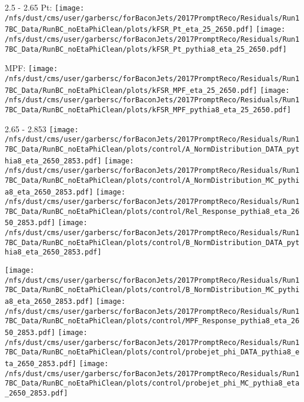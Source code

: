 \documentclass[t,compress]{beamer}
\begin{document}
\begin{frame}{2.5 - 2.65}
	 Pt: \texttt{[image: /nfs/dust/cms/user/garbersc/forBaconJets/2017PromptReco/Residuals/Run17BC\_Data/RunBC\_noEtaPhiClean/plots/kFSR\_Pt\_eta\_25\_2650.pdf]}
	\texttt{[image: /nfs/dust/cms/user/garbersc/forBaconJets/2017PromptReco/Residuals/Run17BC\_Data/RunBC\_noEtaPhiClean/plots/kFSR\_Pt\_pythia8\_eta\_25\_2650.pdf]}
\newline

	 MPF: \texttt{[image: /nfs/dust/cms/user/garbersc/forBaconJets/2017PromptReco/Residuals/Run17BC\_Data/RunBC\_noEtaPhiClean/plots/kFSR\_MPF\_eta\_25\_2650.pdf]}
	\texttt{[image: /nfs/dust/cms/user/garbersc/forBaconJets/2017PromptReco/Residuals/Run17BC\_Data/RunBC\_noEtaPhiClean/plots/kFSR\_MPF\_pythia8\_eta\_25\_2650.pdf]}
\end{frame}

\begin{frame}{2.65 - 2.853}
	\texttt{[image: /nfs/dust/cms/user/garbersc/forBaconJets/2017PromptReco/Residuals/Run17BC\_Data/RunBC\_noEtaPhiClean/plots/control/A\_NormDistribution\_DATA\_pythia8\_eta\_2650\_2853.pdf]}
	\texttt{[image: /nfs/dust/cms/user/garbersc/forBaconJets/2017PromptReco/Residuals/Run17BC\_Data/RunBC\_noEtaPhiClean/plots/control/A\_NormDistribution\_MC\_pythia8\_eta\_2650\_2853.pdf]}
	\texttt{[image: /nfs/dust/cms/user/garbersc/forBaconJets/2017PromptReco/Residuals/Run17BC\_Data/RunBC\_noEtaPhiClean/plots/control/Rel\_Response\_pythia8\_eta\_2650\_2853.pdf]}
	\texttt{[image: /nfs/dust/cms/user/garbersc/forBaconJets/2017PromptReco/Residuals/Run17BC\_Data/RunBC\_noEtaPhiClean/plots/control/B\_NormDistribution\_DATA\_pythia8\_eta\_2650\_2853.pdf]}
\newline

	\texttt{[image: /nfs/dust/cms/user/garbersc/forBaconJets/2017PromptReco/Residuals/Run17BC\_Data/RunBC\_noEtaPhiClean/plots/control/B\_NormDistribution\_MC\_pythia8\_eta\_2650\_2853.pdf]}
	\texttt{[image: /nfs/dust/cms/user/garbersc/forBaconJets/2017PromptReco/Residuals/Run17BC\_Data/RunBC\_noEtaPhiClean/plots/control/MPF\_Response\_pythia8\_eta\_2650\_2853.pdf]}
	\texttt{[image: /nfs/dust/cms/user/garbersc/forBaconJets/2017PromptReco/Residuals/Run17BC\_Data/RunBC\_noEtaPhiClean/plots/control/probejet\_phi\_DATA\_pythia8\_eta\_2650\_2853.pdf]}
	\texttt{[image: /nfs/dust/cms/user/garbersc/forBaconJets/2017PromptReco/Residuals/Run17BC\_Data/RunBC\_noEtaPhiClean/plots/control/probejet\_phi\_MC\_pythia8\_eta\_2650\_2853.pdf]}
\end{frame}
\end{document}
